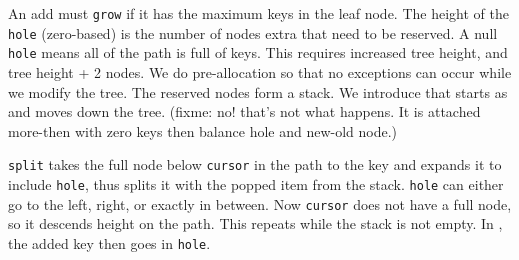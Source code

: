 \documentclass[12pt]{article}
\newcommand{\code}[1]{\colorbox{light-gray}{\texttt{#1}}}
\begin{document}
An add must \code{grow} if it has the maximum keys in the leaf node. The height of the \code{hole} (zero-based) is the number of nodes extra that need to be reserved. A null \code{hole} means all of the path is full of keys. This requires increased tree height, and tree height + 2 nodes. We do pre-allocation so that no exceptions can occur while we modify the tree. The reserved nodes form a stack. We introduce  that starts as  and moves down the tree.
(fixme: no! that's not what happens. It is attached more-then with zero keys then balance hole and new-old node.)

\code{split} takes the full node below \code{cursor} in the path to the key and expands it to include \code{hole}, thus splits it with the popped item from the stack. \code{hole} can either go to the left, right, or exactly in between. Now \code{cursor} does not have a full node, so it descends height on the path. This repeats while the stack is not empty. In , the added key then goes in \code{hole}.
\end{document}
